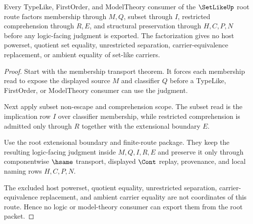 \begin{theorem}
\label{thm:setlike-root-type-model-membership-factorization}
Every TypeLike, FirstOrder, and ModelTheory consumer of the $\SetLikeUp$ root route factors membership through $M,Q$, subset through $I$, restricted comprehension through $R,E$, and structural preservation through $H,C,P,N$ before any logic-facing judgment is exported. The factorization gives no host powerset, quotient set equality, unrestricted separation, carrier-equivalence replacement, or ambient equality of set-like carriers.
\end{theorem}
\begin{proof}
Start with the membership transport theorem. It forces each membership read to expose the displayed source $M$ and classifier $Q$ before a TypeLike, FirstOrder, or ModelTheory consumer can use the judgment.

Next apply subset non-escape and comprehension scope. The subset read is the implication row $I$ over classifier membership, while restricted comprehension is admitted only through $R$ together with the extensional boundary $E$.

Use the root extensional boundary and finite-route package. They keep the resulting logic-facing judgment inside $M,Q,I,R,E$ and preserve it only through componentwise $\hsame$ transport, displayed $\Cont$ replay, provenance, and local naming rows $H,C,P,N$.

The excluded host powerset, quotient equality, unrestricted separation, carrier-equivalence replacement, and ambient carrier equality are not coordinates of this route. Hence no logic or model-theory consumer can export them from the root packet.
\end{proof}

